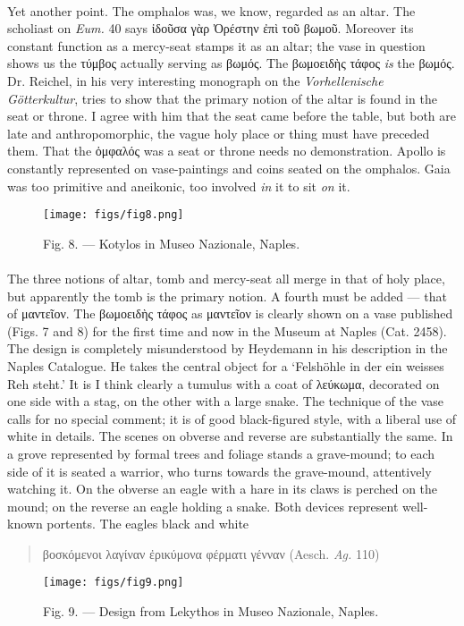 \documentclass[a4paper, 11pt, oneside, polutonikogreek, english]{article}
\begin{document}
\paragraph{}
Yet another point. The omphalos was, we know, regarded as an altar. The scholiast on \emph{Eum.} 40 says ἰδοῦσα γὰρ Ὀρέστην ἐπὶ τοῦ βωμοῦ. Moreover its constant function as a mercy-seat stamps it as an altar; the vase in question shows us the τύμβος actually serving as βωμός. The βωμοειδὴς τάφος \emph{is} the βωμός. Dr. Reichel, in his very interesting monograph on the \emph{Vorhellenische Götterkultur}, tries to show that the primary notion of the altar is found in the seat or throne. I agree with him that the seat came before the table, but both are late and anthropomorphic, the vague holy place or thing must have preceded them. That the ὀμφαλός was a seat or throne needs no demonstration. Apollo is constantly represented on vase-paintings and coins seated on the omphalos. Gaia was too primitive and aneikonic, too involved \emph{in} it to sit \emph{on} it.
\begin{figure}[H]
\centering
\texttt{[image: figs/fig8.png]}
\caption{Fig. 8. --- Kotylos in Museo Nazionale, Naples.}
\end{figure}
\paragraph{}
The three notions of altar, tomb and mercy-seat all merge in that of holy place, but apparently the tomb is the primary notion. A fourth must be added --- that of μαντεῖον. The βωμοειδὴς τάφος as μαντεῖον is clearly shown on a vase published (Figs. 7 and 8) for the first time and now in the Museum at Naples (Cat. 2458). The design is completely misunderstood by Heydemann in his description in the Naples Catalogue. He takes the central object for a `Felshöhle in der ein weisses Reh steht.' It is I think clearly a tumulus with a coat of λεύκωμα, decorated on one side with a stag, on the other with a large snake. The technique of the vase calls for no special comment; it is of good black-figured style, with a liberal use of white in details. The scenes on obverse and reverse are substantially the same. In a grove represented by formal trees and foliage stands a grave-mound; to each side of it is seated a warrior, who turns towards the grave-mound, attentively watching it. On the obverse an eagle with a hare in its claws is perched on the mound; on the reverse an eagle holding a snake. Both devices represent well-known portents. The eagles black and white
\begin{quotation}
βοσκόμενοι λαγίναν ἐρικύμονα φέρματι γένναν (Aesch. \emph{Ag.} 110)
\end{quotation}
\begin{figure}[H]
\centering
\texttt{[image: figs/fig9.png]}
\caption{Fig. 9. --- Design from Lekythos in Museo Nazionale, Naples.}
\end{figure}
\end{document}

